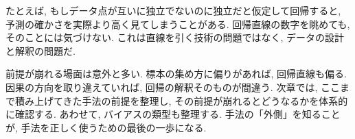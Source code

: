 たとえば, もしデータ点が互いに独立でないのに独立だと仮定して回帰すると, 予測の確かさを実際より高く見てしまうことがある.
回帰直線の数字を眺めても, そのことには気づけない.
これは直線を引く技術の問題ではなく, データの設計と解釈の問題だ.

前提が崩れる場面は意外と多い.
標本の集め方に偏りがあれば, 回帰直線も偏る.
因果の方向を取り違えていれば, 回帰の解釈そのものが間違う.
次章では, ここまで積み上げてきた手法の前提を整理し, その前提が崩れるとどうなるかを体系的に確認する.
あわせて, バイアスの類型も整理する.
手法の「外側」を知ることが, 手法を正しく使うための最後の一歩になる.
